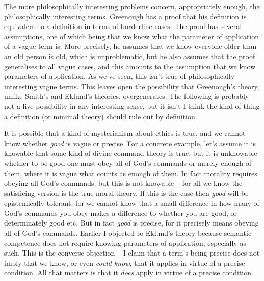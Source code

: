 \documentclass[
  10pt,
  letterpaper,
  DIV=11,
  numbers=noendperiod,
  twoside]{scrartcl}
\begin{document}
The more philosophically interesting problems concern, appropriately
enough, the philosophically interesting terms. Greenough has a proof
that his definition is equivalent to a definition in terms of borderline
cases. The proof has several assumptions, one of which being that we
know what the parameter of application of a vague term is. More
precisely, he assumes that we know everyone older than an old person is
old, which is unproblematic, but he also assumes that the proof
generalises to all vague cases, and this amounts to the assumption that
we know parameters of application. As we've seen, this isn't true of
philosophically interesting vague terms. This leaves open the
possibility that Greenough's theory, unlike Smith's and Eklund's
theories, overgenerates. The following is probably not a live
possibility in any interesting sense, but it isn't I think the kind of
thing a definition (or minimal theory) should rule out by definition.

It is possible that a kind of mysterianism about ethics is true, and we
cannot know whether \emph{good} is vague or precise. For a concrete
example, let's assume it is knowable that some kind of divine command
theory is true, but it is unknowable whether to be good one must obey
all of God's commands or merely enough of them, where it is vague what
counts as enough of them. In fact morality requires obeying all God's
commands, but this is not knowable -- for all we know the satisficing
version is the true moral theory. If this is the case then \emph{good}
will be epistemically tolerant, for we cannot know that a small
difference in how many of God's commands you obey makes a difference to
whether you are good, or determinately good etc. But in fact \emph{good}
is precise, for it precisely means obeying all of God's commands.
Earlier I objected to Eklund's theory because semantic competence does
not require knowing parameters of application, especially as such. This
is the converse objection -- I claim that a term's being precise does
not imply that we know, or even \emph{could know}, that it applies in
virtue of a precise condition. All that matters is that it \emph{does}
apply in virtue of a precise condition.
\end{document}
